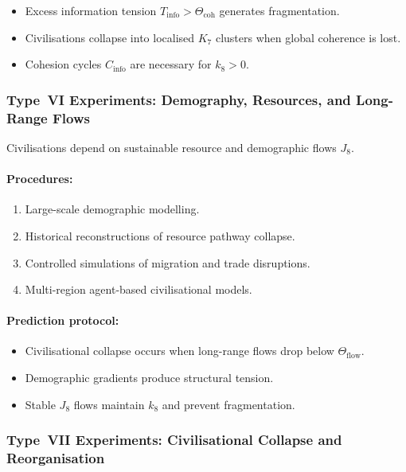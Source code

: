 \begin{itemize}
    \item Excess information tension $T_{\mathrm{info}} > \Theta_{\mathrm{coh}}$ 
          generates fragmentation.
    \item Civilisations collapse into localised $K_7$ clusters when 
          global coherence is lost.
    \item Cohesion cycles $C_{\mathrm{info}}$ are necessary for $k_8 > 0$.
\end{itemize}



\subsubsection{Type~VI Experiments: Demography, Resources, and Long-Range Flows}

Civilisations depend on sustainable resource and demographic flows $J_8$.

\paragraph{Procedures:}

\begin{enumerate}
    \item Large-scale demographic modelling.
    \item Historical reconstructions of resource pathway collapse.
    \item Controlled simulations of migration and trade disruptions.
    \item Multi-region agent-based civilisational models.
\end{enumerate}

\paragraph{Prediction protocol:}

\begin{itemize}
    \item Civilisational collapse occurs when long-range flows drop below
          $\Theta_{\mathrm{flow}}$.
    \item Demographic gradients produce structural tension.
    \item Stable $J_8$ flows maintain $k_8$ and prevent fragmentation.
\end{itemize}



\subsubsection{Type~VII Experiments: Civilisational Collapse and Reorganisation}

